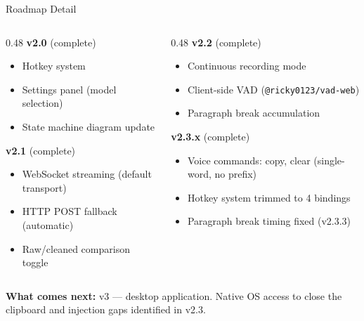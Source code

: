 \documentclass{beamer}
\begin{document}
\begin{frame}{Roadmap Detail}
    \small
    \begin{columns}[T]
        \begin{column}{0.48\textwidth}
            \textbf{v2.0} (complete)
            \begin{itemize}\setlength{\itemsep}{0pt}\setlength{\parskip}{0pt}
                \item Hotkey system
                \item Settings panel (model selection)
                \item State machine diagram update
            \end{itemize}
            \textbf{v2.1} (complete)
            \begin{itemize}\setlength{\itemsep}{0pt}\setlength{\parskip}{0pt}
                \item WebSocket streaming (default transport)
                \item HTTP POST fallback (automatic)
                \item Raw/cleaned comparison toggle
            \end{itemize}
        \end{column}
        \begin{column}{0.48\textwidth}
            \textbf{v2.2} (complete)
            \begin{itemize}\setlength{\itemsep}{0pt}\setlength{\parskip}{0pt}
                \item Continuous recording mode
                \item Client-side VAD (\texttt{@ricky0123/vad-web})
                \item Paragraph break accumulation
            \end{itemize}
            \textbf{v2.3.x} (complete)
            \begin{itemize}\setlength{\itemsep}{0pt}\setlength{\parskip}{0pt}
                \item Voice commands: copy, clear (single-word, no prefix)
                \item Hotkey system trimmed to 4 bindings
                \item Paragraph break timing fixed (v2.3.3)
            \end{itemize}
        \end{column}
    \end{columns}

    \textbf{What comes next:} v3 --- desktop application. Native OS access
    to close the clipboard and injection gaps identified in v2.3.
\end{frame}
\end{document}
